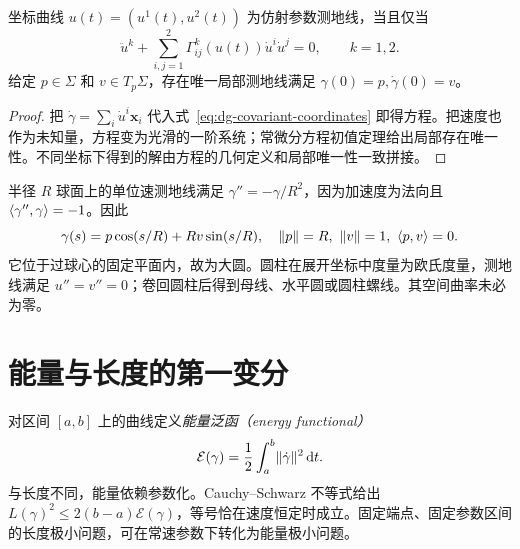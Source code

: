 \begin{theorem}[坐标方程与局部存在唯一性]
坐标曲线 $u(t)=(u^1(t),u^2(t))$ 为仿射参数测地线，当且仅当
\begin{equation}
 \ddot u^k+\sum_{i,j=1}^2\Gamma^k_{ij}(u(t))\dot u^i\dot u^j=0,
 \qquad k=1,2.
 \label{eq:dg-geodesic-equations}
\end{equation}
给定 $p\in\Sigma$ 和 $v\in T_p\Sigma$，存在唯一局部测地线满足 $\gamma(0)=p,\dot\gamma(0)=v$。
\end{theorem}
\begin{proof}
把 $\dot\gamma=\sum_i\dot u^i\mathbf x_i$ 代入式~\eqref{eq:dg-covariant-coordinates} 即得方程。把速度也作为未知量，方程变为光滑的一阶系统；常微分方程初值定理给出局部存在唯一性。不同坐标下得到的解由方程的几何定义和局部唯一性一致拼接。
\end{proof}

\begin{example}[球面与圆柱上的测地线]
半径 $R$ 球面上的单位速测地线满足 $\gamma''=-\gamma/R^2$，因为加速度为法向且 $\langle \gamma'',\gamma\rangle=-1$。因此
\[
 \gamma(s)=p\cos(s/R)+Rv\sin(s/R),\quad
 \lVert p\rVert=R,\ \lVert v\rVert=1,\ \langle p,v\rangle=0.
\]
它位于过球心的固定平面内，故为大圆。圆柱在展开坐标中度量为欧氏度量，测地线满足 $u''=v''=0$；卷回圆柱后得到母线、水平圆或圆柱螺线。其空间曲率未必为零。
\end{example}

\section{能量与长度的第一变分}
对区间 $[a,b]$ 上的曲线定义\emph{能量泛函（energy functional）}
\[
 \mathcal E(\gamma)=\frac12\int_a^b\lVert \dot\gamma\rVert^2\mathop{}\!\mathrm d t.
\]
与长度不同，能量依赖参数化。Cauchy--Schwarz 不等式给出 $L(\gamma)^2\le2(b-a)\mathcal E(\gamma)$，等号恰在速度恒定时成立。固定端点、固定参数区间的长度极小问题，可在常速参数下转化为能量极小问题。

